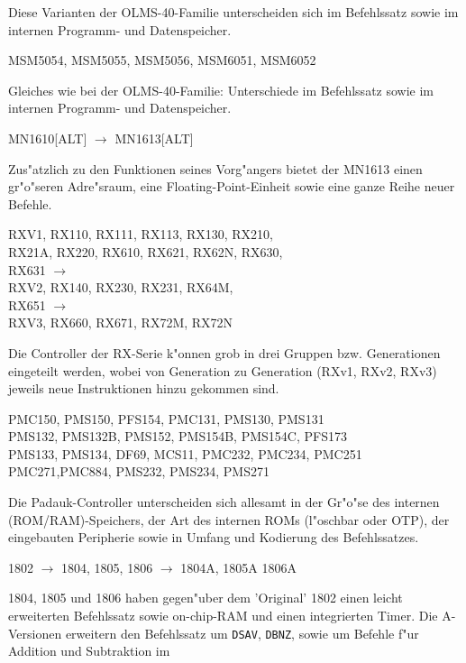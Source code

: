 \documentclass[12pt,a4paper,twoside]{report}
\newcommand{\tty}[1]{{\tt #1}}
\begin{document}
Diese Varianten der OLMS-40-Familie unterscheiden sich im
Befehlssatz sowie im internen Programm- und Datenspeicher.
\begin{cpulist}
   MSM5054, MSM5055, MSM5056, MSM6051, MSM6052
\end{cpulist}
Gleiches wie bei der OLMS-40-Familie: Unterschiede im
Befehlssatz sowie im internen Programm- und Datenspeicher.
\begin{cpulist}
   MN1610[ALT] $\rightarrow$ MN1613[ALT]
\end{cpulist}
Zus"atzlich zu den Funktionen seines Vorg"angers bietet der
MN1613 einen gr"o"seren Adre"sraum, eine Floating-Point-Einheit
sowie eine ganze Reihe neuer Befehle.
\begin{cpulist}
   RXV1, RX110, RX111, RX113, RX130, RX210,\\
\> RX21A, RX220, RX610, RX621, RX62N, RX630,\\
\> RX631 $\longrightarrow$ \\
\> RXV2, RX140, RX230, RX231, RX64M,\\
\> RX651 $\longrightarrow$ \\
\> RXV3, RX660, RX671, RX72M, RX72N
\end{cpulist}
Die Controller der RX-Serie k"onnen grob in drei
Gruppen bzw. Generationen eingeteilt werden, wobei
von Generation zu Generation (RXv1, RXv2, RXv3)
jeweils neue Instruktionen hinzu gekommen sind.
\begin{cpulist}
   PMC150, PMS150, PFS154, PMC131, PMS130, PMS131 \\
\> PMS132, PMS132B, PMS152, PMS154B, PMS154C, PFS173 \\
\> PMS133, PMS134, DF69, MCS11, PMC232, PMC234, PMC251 \\
\> PMC271,PMC884, PMS232, PMS234, PMS271
\end{cpulist}
Die Padauk-Controller unterscheiden sich allesamt in
der Gr"o"se des internen (ROM/RAM)-Speichers, der Art
des internen ROMs (l"oschbar oder OTP), der eingebauten
Peripherie sowie in Umfang und Kodierung des Befehlssatzes.
\begin{cpulist}
   1802 $\rightarrow$ 1804, 1805, 1806 $\rightarrow$ 1804A, 1805A
1806A
\end{cpulist}
1804, 1805 und 1806 haben gegen"uber dem 'Original' 1802 einen leicht
erweiterten Befehlssatz sowie on-chip-RAM und einen integrierten
Timer.  Die A-Versionen erweitern den Befehlssatz um \tty{DSAV},
\tty{DBNZ}, sowie um Befehle f"ur Addition und Subtraktion im
\end{document}
